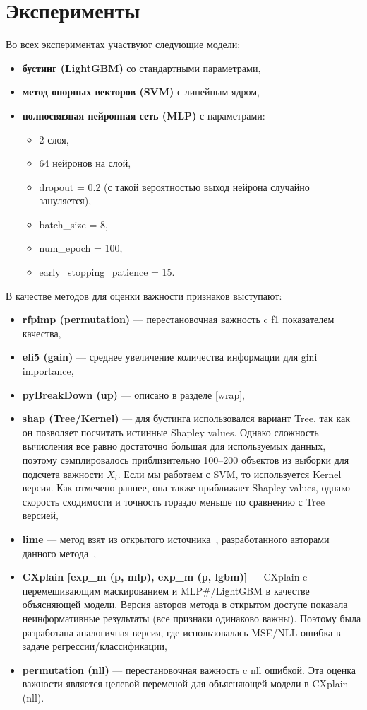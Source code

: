 \documentclass[12pt]{article}
\begin{document}
\section{Эксперименты}
Во всех экспериментах участвуют следующие модели:
\begin{itemize}[noitemsep]
    \item \textbf{бустинг (LightGBM)} со стандартными параметрами,
    \item \textbf{метод опорных векторов (SVM)} с линейным ядром,
    \item \textbf{полносвязная нейронная сеть (MLP)} с параметрами:
        \begin{itemize}[noitemsep]
            \item 2 слоя,
            \item 64 нейронов на слой,
            \item dropout = 0.2 (с такой вероятностью выход нейрона случайно зануляется),
            \item batch\_size = 8,
            \item num\_epoch = 100,
            \item early\_stopping\_patience = 15.
        \end{itemize}
\end{itemize}
В качестве методов для оценки важности признаков выступают:
\begin{itemize}[noitemsep]
    \item \textbf{rfpimp (permutation)} --- перестановочная важность c f1 показателем качества,
    \item \textbf{eli5 (gain)} --- среднее увеличение количества информации для gini importance,
    \item \textbf{pyBreakDown (up)} --- описано в разделе \ref{wrap},
    \item \textbf{shap (Tree/Kernel)} --- для бустинга использовался вариант Tree, так как он позволяет посчитать истинные Shapley values. Однако сложность вычисления все равно достаточно большая для используемых данных, поэтому сэмплировалось приблизительно 100--200 объектов из выборки для подсчета важности $X_i$. Если мы работаем с SVM, то используется Kernel версия. Как отмечено раннее, она также приближает Shapley values, однако скорость сходимости и точность гораздо меньше по сравнению с Tree версией,
    \item \textbf{lime} --- метод взят из открытого источника~\citep{lime_git}, разработанного авторами данного метода~\citep{lime},
    \item \textbf{CXplain [exp\_m (p, mlp),  exp\_m (p, lgbm)]} --- CXplain c перемешивающим маскированием и MLP#/LightGBM в качестве объясняющей модели. Версия авторов метода в открытом доступе показала неинформативные результаты (все признаки одинаково важны). Поэтому была разработана аналогичная версия, где использовалась MSE/NLL ошибка в задаче регрессии/классификации,
    \item \textbf{permutation (nll)} --- перестановочная важность c nll ошибкой.
    Эта оценка важности является целевой переменой для объясняющей модели в CXplain (nll). 
\end{itemize}
\end{document}
